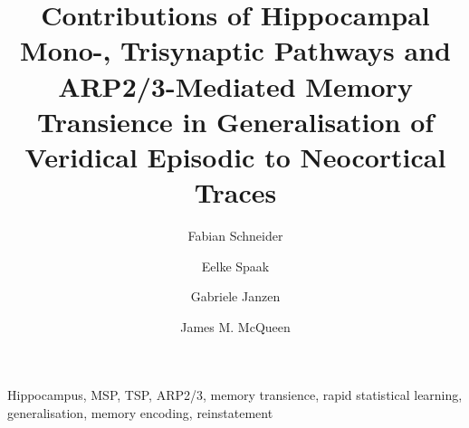 \documentclass[preprint,authoryear]{../../Stylesheets/elsarticle/elsarticle}
\begin{document}
 


\begin{frontmatter}


\journal{}
\title{Contributions of Hippocampal Mono-, Trisynaptic Pathways and ARP2/3-Mediated Memory Transience in Generalisation of Veridical Episodic to Neocortical Traces}
\author[AD_DCC,AD_MPI]{Fabian Schneider}
\author[AD_DCC]{Eelke Spaak}
\author[AD_DCC,AD_BSI]{Gabriele Janzen}
\author[AD_DCC,AD_MPI]{James M. McQueen}

\address[AD_DCC]{Donders Institute for Brain, Cognition and Behaviour, Radboud University Nijmegen, 6525 EN Nijmegen, The Netherlands}
\address[AD_BSI]{Behavioral Science Institute, Radboud University Nijmegen, 6525 EN Nijmegen, The Netherlands}
\address[AD_MPI]{Max-Planck-Institute for Psycholinguistics, 6525 XD Nijmegen, The Netherlands}


\begin{keyword}

Hippocampus, MSP, TSP, ARP2/3, memory transience, rapid statistical learning, generalisation, memory encoding, reinstatement
\end{keyword}

\end{frontmatter}




\newpage

\savethetrees

\savethetrees

\savethetrees

\savethetrees

\savethetrees

\savethetrees





\onecolumn

%


\end{document}
